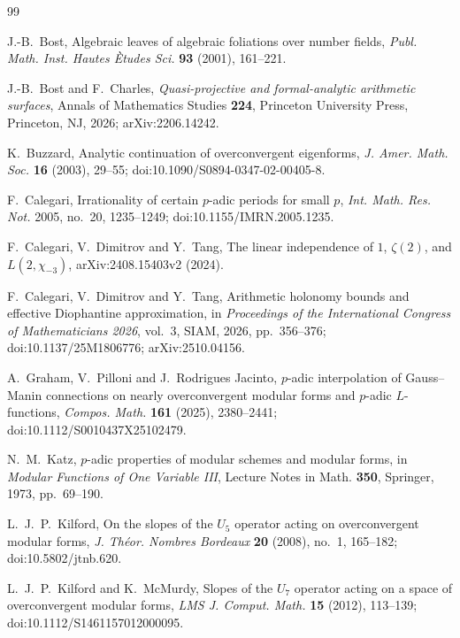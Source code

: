 \documentclass[11pt]{article}
\theoremstyle{definition}
\theoremstyle{remark}
\begin{document}
\begin{thebibliography}{99}

J.-B.~Bost,
\newblock Algebraic leaves of algebraic foliations over number fields,
\newblock \emph{Publ. Math. Inst. Hautes \`Etudes Sci.} \textbf{93} (2001),
161--221.

J.-B.~Bost and F.~Charles,
\newblock \emph{Quasi-projective and formal-analytic arithmetic surfaces},
\newblock Annals of Mathematics Studies \textbf{224}, Princeton University
Press, Princeton, NJ, 2026; arXiv:2206.14242.

K.~Buzzard,
\newblock Analytic continuation of overconvergent eigenforms,
\newblock \emph{J. Amer. Math. Soc.} \textbf{16} (2003), 29--55;
\newblock doi:10.1090/S0894-0347-02-00405-8.

F.~Calegari,
\newblock Irrationality of certain $p$-adic periods for small $p$,
\newblock \emph{Int. Math. Res. Not.} 2005, no.~20, 1235--1249;
\newblock doi:10.1155/IMRN.2005.1235.

F.~Calegari, V.~Dimitrov and Y.~Tang,
\newblock The linear independence of $1$, $\zeta(2)$, and
$L(2,\chi_{-3})$,
\newblock arXiv:2408.15403v2 (2024).

F.~Calegari, V.~Dimitrov and Y.~Tang,
\newblock Arithmetic holonomy bounds and effective Diophantine approximation,
\newblock in \emph{Proceedings of the International Congress of
Mathematicians 2026}, vol.~3, SIAM, 2026, pp.~356--376;
\newblock doi:10.1137/25M1806776; arXiv:2510.04156.

A.~Graham, V.~Pilloni and J.~Rodrigues Jacinto,
\newblock $p$-adic interpolation of Gauss--Manin connections on nearly
overconvergent modular forms and $p$-adic $L$-functions,
\newblock \emph{Compos. Math.} \textbf{161} (2025), 2380--2441;
\newblock doi:10.1112/S0010437X25102479.

N.~M.~Katz,
\newblock $p$-adic properties of modular schemes and modular forms,
\newblock in \emph{Modular Functions of One Variable III},
Lecture Notes in Math. \textbf{350}, Springer, 1973, pp.~69--190.

L.~J.~P.~Kilford,
\newblock On the slopes of the $U_5$ operator acting on overconvergent modular forms,
\newblock \emph{J. Th\'eor. Nombres Bordeaux} \textbf{20} (2008), no.~1,
165--182; doi:10.5802/jtnb.620.

L.~J.~P.~Kilford and K.~McMurdy,
\newblock Slopes of the $U_7$ operator acting on a space of overconvergent modular forms,
\newblock \emph{LMS J. Comput. Math.} \textbf{15} (2012), 113--139;
\newblock doi:10.1112/S1461157012000095.


\end{thebibliography}
\end{document}
